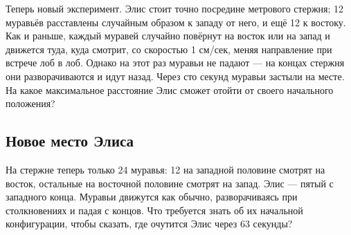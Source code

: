Теперь новый эксперимент.
Элис стоит точно посредине метрового стержня; 12 муравьёв расставлены случайным образом к западу от него, и ещё 12 к востоку.
Как и раньше, каждый муравей случайно повёрнут на восток или на запад и движется туда, куда смотрит, со скоростью 1 см/сек, меняя направление при встрече лоб в лоб.
Однако на этот раз муравьи не падают ---
на концах стержня они разворачиваются и идут назад.
Через сто секунд муравьи застыли на месте.
На какое максимальное расстояние Элис сможет отойти от своего начального положения?

\subsection*{Новое место Элиса}

На стержне теперь только 24 муравья:
12 на западной половине смотрят на восток,
остальные на восточной половине смотрят на запад.
Элис --- пятый с западного конца.
Муравьи движутся как обычно, разворачиваясь при столкновениях и падая с концов.
Что требуется знать об их начальной конфигурации, чтобы сказать, где очутится Элис через 63 секунды?
